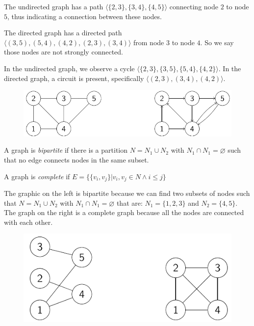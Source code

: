 \documentclass[12pt, a4paper]{report}
\begin{document}
    \begin{example}
        The undirected graph has a path $\langle \{2,3\},\{3,4\},\{4,5\}\rangle$ connecting node $2$ to node $5$, thus indicating a connection between these nodes.
        
        The directed graph has a directed path $\langle (3,5),(5,4),(4,2),(2,3),(3,4) \rangle$ from node $3$ to node $4$. So we say those nodes are not strongly connected. 
        
        In the undirected graph, we observe a cycle $\langle \{2,3\},\{3,5\},\{5,4\},\{4,2\}\rangle$. 
        In the directed graph, a circuit is present, specifically $\langle (2,3),(3,4),(4,2) \rangle$. 
        \begin{figure}[H]
            \centering
            \includegraphics[width=0.75\linewidth]{images/graph.png}
        \end{figure}
    \end{example}
    \newpage
    \begin{definition}
        A graph is \emph{bipartite} if there is a partition $N=N_1 \cup N_2$ with $N_1 \cap N_1 = \varnothing$ such that no edge connects nodes in the same subset. 

        A graph is \emph{complete} if $E=\{ \{v_i,v_j\} | v_i,v_j \in N \land i \leq j \}$
    \end{definition}
    \begin{example}
        The graphic on the left is bipartite because we can find two subsets of nodes such that $N=N_1 \cup N_2$ with $N_1 \cap N_1 = \varnothing$ that are: $N_1=\{1,2,3\}$ and $N_2=\{4,5\}$. 
        The graph on the right is a complete graph because all the nodes are connected with each other. 
        \begin{figure}[H]
            \centering
            \includegraphics[width=0.5\linewidth]{images/bipcomp.png}
        \end{figure}
    \end{example}
\end{document}

